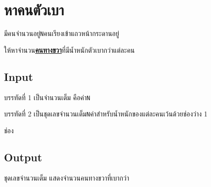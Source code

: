 \documentclass{article}
\begin{document}
\section*{หาคนตัวเบา}

มีคนจำนวนอยู่\texttt{N}คนเรียงเข้าแถวหน้ากระดานอยู่

ให้หาจำนวน\ul{\textbf{คนทางขวา}}ที่มีน้ำหนักตัวเบากว่าแต่ละคน\\



\subsection*{Input}
บรรทัดที่ 1 เป็นจำนวนเต็ม คือค่า\texttt{N}



บรรทัดที่ 2 เป็นชุดเลขจำนวนเต็ม\texttt{N}ค่าสำหรับน้ำหนักของแต่ละคนเว้นด้วยช่องว่าง 1

ช่อง



\subsection*{Output}
ชุดเลขจำนวนเต็ม แสดงจำนวนคนทางขวาที่เบากว่า\\
\end{document}
